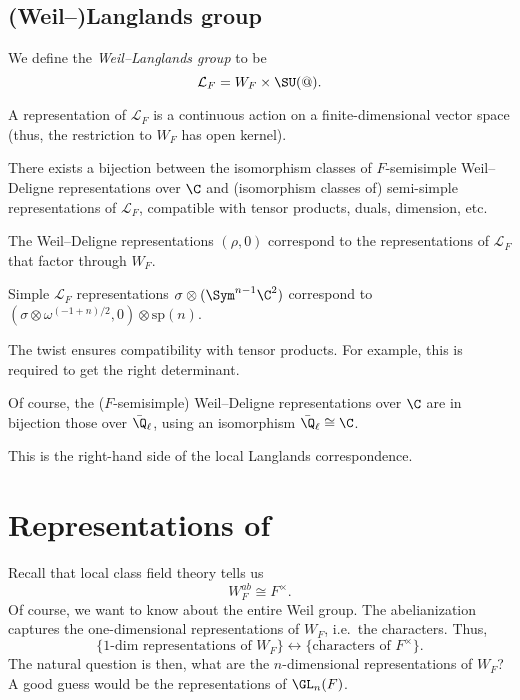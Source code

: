 \documentclass[a4paper]{article}
\newcommand\sp{\mathrm{sp}}
\begin{document}
\subsection{(Weil--)Langlands group}
\begin{defi}
  We define the \emph{Weil--Langlands group} to be
  \[
    \mathcal{L}_F = W_F \times \SU(@).
  \]
\end{defi}
A representation of $\mathcal{L}_F$ is a continuous action on a finite-dimensional vector space (thus, the restriction to $W_F$ has open kernel).
\begin{thm}
  There exists a bijection between the isomorphism classes of $F$-semisimple Weil--Deligne representations over $\C$ and (isomorphism classes of) semi-simple representations of $\mathcal{L}_F$, compatible with tensor products, duals, dimension, etc.

  The Weil--Deligne representations $(\rho, 0)$ correspond to the representations of $\mathcal{L}_F$ that factor through $W_F$.

  Simple $\mathcal{L}_F$ representations $\sigma \otimes (\Sym^{n - 1} \C^2)$ correspond to $(\sigma \otimes \omega^{(-1 + n)/2}, 0) \otimes \sp(n)$.
\end{thm}
The twist ensures compatibility with tensor products. For example, this is required to get the right determinant. %

Of course, the ($F$-semisimple) Weil--Deligne representations over $\C$ are in bijection those over $\bar{\Q}_\ell$, using an isomorphism $\bar{\Q}_\ell \cong \C$.

This is the right-hand side of the local Langlands correspondence.

\section{Representations of }
Recall that local class field theory tells us
\[
  W_F^{ab} \cong F^\times.
\]
Of course, we want to know about the entire Weil group. The abelianization captures the one-dimensional representations of $W_F$, i.e.\ the characters. Thus,
\[
  \{1\text{-dim representations of }W_F\} \leftrightarrow \{\text{characters of }F^\times\}.
\]
The natural question is then, what are the $n$-dimensional representations of $W_F$? A good guess would be the representations of $\GL_n(F)$.
\end{document}
